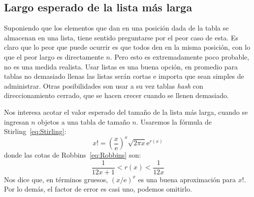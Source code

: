 \subsection{Largo esperado de la lista más larga}
\label{sec:lista-mas-larga}

  Suponiendo que los elementos que dan en una posición dada de la tabla
  se almacenan en una lista,
  tiene sentido preguntarse por el peor caso de esta.
  Es claro que lo peor que puede ocurrir es que todos den en la misma posición,
  con lo que el peor largo es directamente \(n\).
  Pero esto es extremadamente poco probable,
  no es una medida realista.
  Usar listas es una buena opción,
  en promedio
  para tablas no demasiado llenas las listas serán cortas
  e importa que sean simples de administrar.
  Otras posibilidades son usar
  a su vez tablas \emph{\foreignlanguage{english}{hash}}
  con direccionamiento cerrado,
  que se hacen crecer cuando se llenen demasiado.

  Nos interesa acotar el valor esperado del tamaño de la lista más larga,
  cuando se ingresan \(n\) objetos a una tabla de tamaño \(n\).
  Usaremos la fórmula de Stirling~\eqref{eq:Stirling}:
  \begin{equation*}
    x!
      = \left( \frac{x}{\mathrm{e}} \right)^x
          \sqrt{2 \pi x}
          \mathrm{e}^{r(x)}
  \end{equation*}
  donde las cotas de Robbins~\eqref{eq:Robbins} son:
  \begin{equation*}
    \frac{1}{12 x + 1}
      < r(x)
      < \frac{1}{12 x}
  \end{equation*}
  Nos dice que,
  en términos gruesos,
  \((x/\mathrm{e})^x\) es una buena aproximación para \(x!\).
  Por lo demás,
  el factor de error es casi uno,
  podemos omitirlo.

